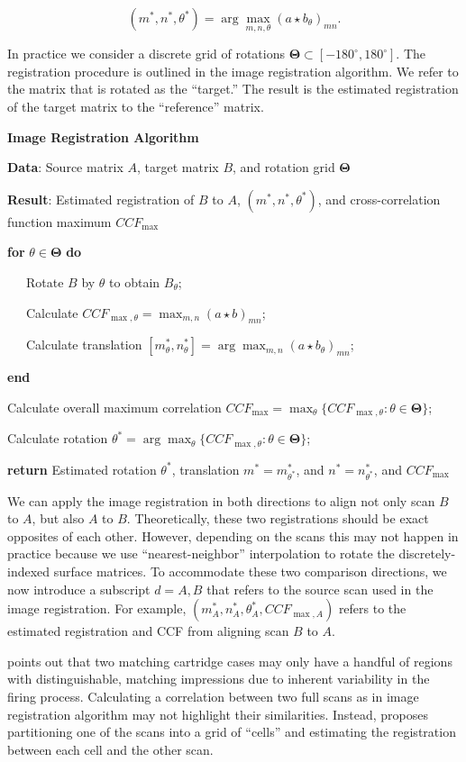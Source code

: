 \documentclass[11pt,]{isuthesis}
\begin{document}
\[
(m^*,n^*,\theta^*) = \arg \max_{m,n,\theta} (a \star b_\theta)_{mn}.
\]

In practice we consider a discrete grid of rotations \(\pmb{\Theta} \subset [-180^\circ,180^\circ]\).
The registration procedure is outlined in the image registration algorithm.
We refer to the matrix that is rotated as the ``target.''
The result is the estimated registration of the target matrix to the ``reference'' matrix.

\textbf{Image Registration Algorithm}

\textbf{Data}: Source matrix \(A\), target matrix \(B\), and rotation grid \(\pmb{\Theta}\)

\textbf{Result}: Estimated registration of \(B\) to \(A\), \((m^*, n^*, \theta^*)\), and cross-correlation function maximum \(CCF_{\max}\)

\textbf{for} \(\theta \in \pmb{\Theta}\) \textbf{do}

~~~Rotate \(B\) by \(\theta\) to obtain \(B_\theta\);

~~~Calculate \(CCF_{\max,\theta} = \max_{m,n} (a \star b)_{mn}\);

~~~Calculate translation \([m_{\theta}^*, n_{\theta}^*] = \arg \max_{m,n} (a \star b_\theta)_{mn}\);

\textbf{end}

Calculate overall maximum correlation \(CCF_{\max} = \max_{\theta} \{CCF_{\max, \theta} : \theta \in \pmb{\Theta}\}\);

Calculate rotation \(\theta^* = \arg \max_{\theta} \{CCF_{\max,\theta} : \theta \in \pmb{\Theta}\}\);

\textbf{return} Estimated rotation \(\theta^*\), translation \(m^* = m_{\theta^*}^*\), and \(n^* = n_{\theta^*}^*\), and \(CCF_{\max}\)

We can apply the image registration in both directions to align not only scan \(B\) to \(A\), but also \(A\) to \(B\).
Theoretically, these two registrations should be exact opposites of each other.
However, depending on the scans this may not happen in practice because we use ``nearest-neighbor'' interpolation to rotate the discretely-indexed surface matrices.
To accommodate these two comparison directions, we now introduce a subscript \(d = A,B\) that refers to the source scan used in the image registration.
For example, \((m_A^*, n_A^*, \theta_A^*, CCF_{\max,A})\) refers to the estimated registration and CCF from aligning scan \(B\) to \(A\).

\citet{song_proposed_2013} points out that two matching cartridge cases may only have a handful of regions with distinguishable, matching impressions due to inherent variability in the firing process.
Calculating a correlation between two full scans as in image registration algorithm may not highlight their similarities.
Instead, \citet{song_proposed_2013} proposes partitioning one of the scans into a grid of ``cells'' and estimating the registration between each cell and the other scan.
\end{document}

